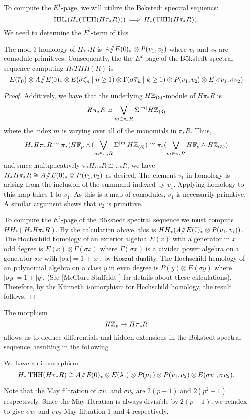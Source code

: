 To compute the $E^1$-page, we will utilize the B\"okstedt spectral sequence:
\[
\operatorname{HH}_*(H_*(\operatorname{THH}(H\pi_*R)))\implies H_*( \operatorname{THH}(H\pi_*R)).
\]
We need to determine the $E^1$-term of this 
\begin{lem}
	The mod 3 homology of $H\pi_*R$ is $A\! \sslash \! E(0)_*\otimes P(v_1, v_2)$ where $v_1$ and $v_2$ are comodule primitives. Consequently, the the $E^2$-page of the B\"okstedt spectral sequence computing $H_*THH(R)$ is 
	\[
E(\overline{\tau}_0)\otimes A\! \sslash \! E(0)_*\otimes E(\sigma\zeta_n\mid n\geq 1)\otimes \Gamma(\sigma\overline{\tau}_k\mid k\geq 1)\otimes P(v_1,v_2)\otimes E(\sigma v_1, \sigma v_2)
\]
\end{lem}
\begin{proof}
	Additively, we have that the underlying $H\mathbb{Z}_{(3)}$-module of $H\pi_*R$ is 
	\[
	H\pi_*R\simeq  \bigvee_{m\in \pi_*R}\Sigma^{|m|}H\mathbb{Z}_{(3)}
	\]
	where the index $m$ is varying over all of the monomials in $\pi_*R$. Thus, 
	\[ H_*H\pi_*R\cong \pi_*(H\mathbb{F}_p \wedge  ( \bigvee_{m\in \pi_*R}\Sigma^{|m|}H\mathbb{Z}_{(3)})\cong  \pi_* ( \bigvee_{m\in \pi_*R} H\mathbb{F}_p\wedge H\mathbb{Z}_{(3)}) \]
	and since multiplicatively $\pi_*H\pi_*R\cong \pi_*R$, we have $H_*H\pi_*R\cong A\! \sslash \! E(0)_*\otimes P(v_1, v_2)$ as desired. 
	The element $v_1$ in homology is arising from the inclusion of the summand indexed by $v_1$. Applying homology to this map takes $1$ to $v_1$. As this is a map of comodules, $v_1$ is necessarily primitive. A similar argument shows that $v_2$ is primitive.
	
	To compute the $E^2$-page of the B\"okstedt spectral sequence we must compute $HH_*(H_*H\pi_*R)$. By the calculation above, this is $HH_*(A\! \sslash \! E(0)_*\otimes P(v_1, v_2))$. The Hochschild homology of an exterior algebra $E(x)$ with a generator in $x$ odd degree is $E(x)\otimes \Gamma(\sigma x)$ where $\Gamma(\sigma x)$ is a divided power algebra on a generator $\sigma x$ with $|\sigma x|=1+|x|$, by Koszul duality. The Hochschild homology of an polynomial algebra on a class $y$ in even degree is $P(y)\otimes E(\sigma y)$ where $|\sigma y|=1+|y|$. (See [McClure-Staffeldt \cite{qx}] for details about these calculations). Therefore, by the K\"unneth isomorphism for Hochschild homology, the result follows. 
\end{proof}

The morphism 
\[
H\mathbb{Z}_p\to H\pi_*R
\]
allows us to deduce differentials and hidden extensions in the B\"okstedt spectral sequence, resulting in the following. 
\begin{prop} \label{prop:homologyTHH-E0} We have an isomorphism
\[
H_*\operatorname{THH}(H\pi_*R)\cong A\! \sslash \! E(0)_*\otimes E(\lambda_1)\otimes P(\mu_1)\otimes P(v_1,v_2)\otimes E(\sigma v_1,\sigma v_2).
\]
\end{prop}
Note that the May filtration of $\sigma v_1$ and $\sigma v_2$ are $2(p-1)$ and $2(p^2-1)$ respectively. Since the May filtration is always divisible by $2(p-1)$, we reindex to give $\sigma v_1$ and $\sigma v_2$ May filtration 1 and $4$ respectively. 


